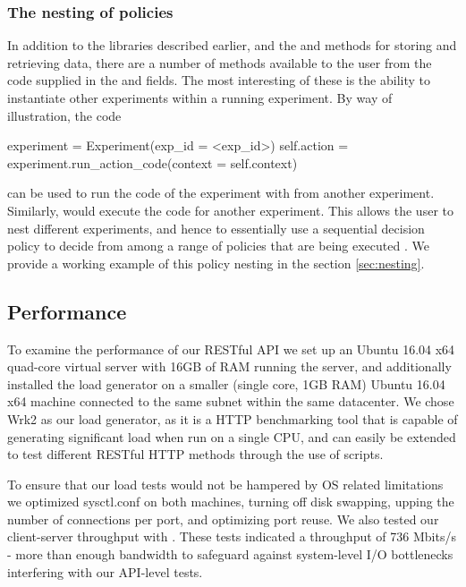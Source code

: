 \documentclass[nojss]{jss}
\begin{document}
\subsubsection{The nesting of policies}

In addition to the libraries described earlier, and the  and  methods for storing and retrieving data, there are a number of methods available to the user from the code supplied in the   and  fields. The most interesting of these is the ability to instantiate other experiments within a running experiment. By way of illustration, the code
\begin{Code}
experiment = Experiment(exp_id =  <exp_id>)
self.action = experiment.run_action_code(context =  self.context)
\end{Code}
can be used to run the  code of the experiment with  from another experiment. Similarly,  would execute the  code for another experiment. This allows the user to nest different experiments, and hence to essentially use a sequential decision policy  to decide from among a range of policies that are being executed . We provide a working example of this policy nesting in the section
\ref{sec:nesting}.


\subsection{Performance}

To examine the performance of our RESTful API we set up an Ubuntu 16.04 x64 quad-core virtual server with 16GB of RAM running the  server, and additionally installed the  load generator on a smaller (single core, 1GB RAM) Ubuntu 16.04 x64 machine connected to the same subnet within the same datacenter. We chose Wrk2 \citep{tenetene} as our load generator, as it is a HTTP benchmarking tool that is capable of generating significant load when run on a single CPU, and can easily be extended to test different RESTful HTTP methods through the use of  scripts.

To ensure that our load tests would not be hampered by OS related limitations we optimized sysctl.conf on both machines, turning off disk swapping, upping the number of connections per port, and optimizing port reuse. We also tested our client-server throughput with  \citep{Iperf.fr2016}. These tests indicated a throughput of 736 Mbits/s - more than enough bandwidth to safeguard against system-level I/O bottlenecks interfering with our API-level tests.
\end{document}
